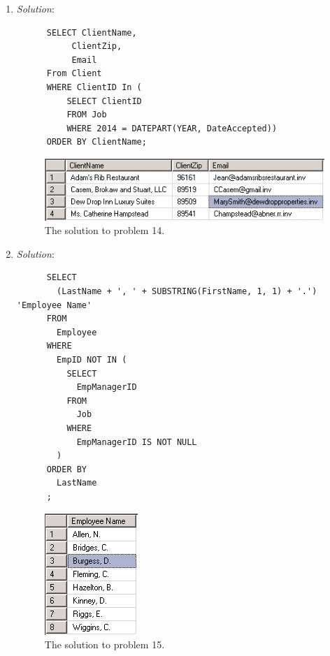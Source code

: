 \documentclass{article}
\begin{document}
\begin{enumerate}
  \newpage
  \item %
  \textit{Solution}:
  \begin{verbatim}
      SELECT ClientName,
           ClientZip,
           Email
      From Client
      WHERE ClientID In (
          SELECT ClientID
          FROM Job
          WHERE 2014 = DATEPART(YEAR, DateAccepted))
      ORDER BY ClientName;
  \end{verbatim}

  \begin{figure}[h!]
    \centering
    \includegraphics[width=.5\linewidth]{QueryResults/HW04_Problem14_query}
    \caption{The solution to problem 14.}
    \label{fig:HW04_Problem14}
  \end{figure}

  \newpage
  \item %

  \textit{Solution}:
  \begin{verbatim}
      SELECT
        (LastName + ', ' + SUBSTRING(FirstName, 1, 1) + '.') 'Employee Name'
      FROM
        Employee
      WHERE
        EmpID NOT IN (
          SELECT
            EmpManagerID
          FROM
            Job
          WHERE
            EmpManagerID IS NOT NULL
        )
      ORDER BY
        LastName
      ;
  \end{verbatim}

  \begin{figure}[h!]
    \centering
    \includegraphics[width=.2\linewidth]{QueryResults/HW04_Problem15_query}
    \caption{The solution to problem 15.}
    \label{fig:HW04_Problem15_query}
  \end{figure}
\end{enumerate}
\end{document}
